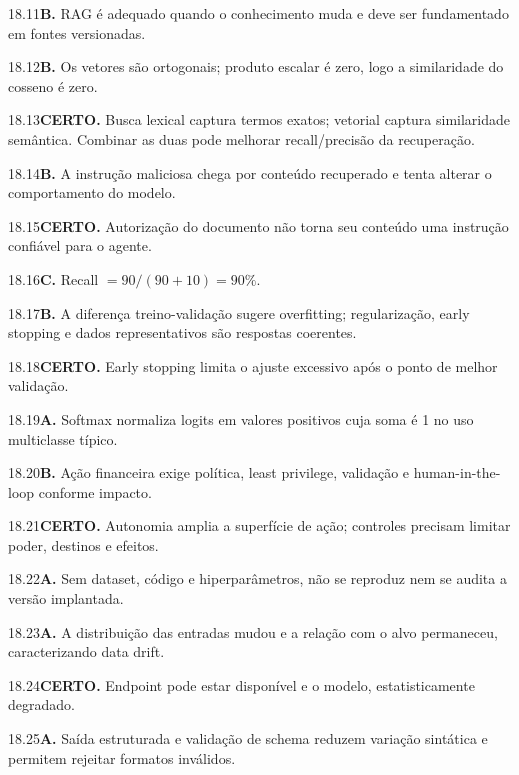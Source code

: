 \begin{solucao}{18.11}\textbf{B.} RAG é adequado quando o conhecimento muda e deve ser fundamentado em fontes versionadas.\end{solucao}
\begin{solucao}{18.12}\textbf{B.} Os vetores são ortogonais; produto escalar é zero, logo a similaridade do cosseno é zero.\end{solucao}
\begin{solucao}{18.13}\textbf{CERTO.} Busca lexical captura termos exatos; vetorial captura similaridade semântica. Combinar as duas pode melhorar recall/precisão da recuperação.\end{solucao}
\begin{solucao}{18.14}\textbf{B.} A instrução maliciosa chega por conteúdo recuperado e tenta alterar o comportamento do modelo.\end{solucao}
\begin{solucao}{18.15}\textbf{CERTO.} Autorização do documento não torna seu conteúdo uma instrução confiável para o agente.\end{solucao}
\begin{solucao}{18.16}\textbf{C.} Recall $=90/(90+10)=90\%$.\end{solucao}
\begin{solucao}{18.17}\textbf{B.} A diferença treino-validação sugere overfitting; regularização, early stopping e dados representativos são respostas coerentes.\end{solucao}
\begin{solucao}{18.18}\textbf{CERTO.} Early stopping limita o ajuste excessivo após o ponto de melhor validação.\end{solucao}
\begin{solucao}{18.19}\textbf{A.} Softmax normaliza logits em valores positivos cuja soma é 1 no uso multiclasse típico.\end{solucao}
\begin{solucao}{18.20}\textbf{B.} Ação financeira exige política, least privilege, validação e human-in-the-loop conforme impacto.\end{solucao}
\begin{solucao}{18.21}\textbf{CERTO.} Autonomia amplia a superfície de ação; controles precisam limitar poder, destinos e efeitos.\end{solucao}
\begin{solucao}{18.22}\textbf{A.} Sem dataset, código e hiperparâmetros, não se reproduz nem se audita a versão implantada.\end{solucao}
\begin{solucao}{18.23}\textbf{A.} A distribuição das entradas mudou e a relação com o alvo permaneceu, caracterizando data drift.\end{solucao}
\begin{solucao}{18.24}\textbf{CERTO.} Endpoint pode estar disponível e o modelo, estatisticamente degradado.\end{solucao}
\begin{solucao}{18.25}\textbf{A.} Saída estruturada e validação de schema reduzem variação sintática e permitem rejeitar formatos inválidos.\end{solucao}

